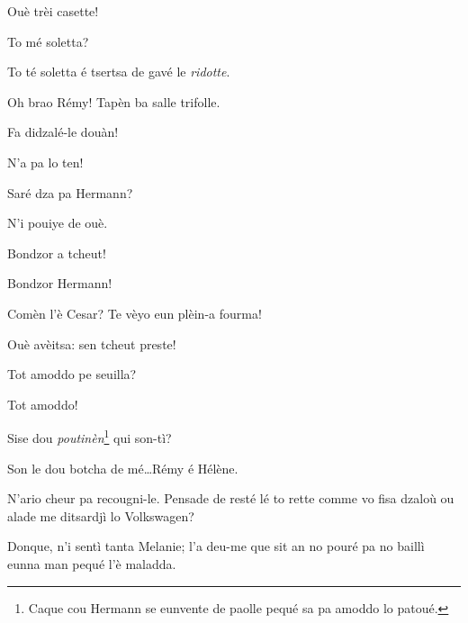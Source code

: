 \begin{drama}
\Cesarspeaks Ouè trèi casette!

\Helenespeaks To mé soletta?

\Cesarspeaks To té soletta é tsertsa de gavé le \textit{ridotte}.


\Cesarspeaks Oh brao Rémy! Tapèn ba salle trifolle.

\Remyspeaks Fa didzalé-le douàn!

\Cesarspeaks N'a pa lo ten!





\Cesarspeaks Saré dza pa Hermann?

\Cesarspeaks N'i pouiye de ouè. 




\Hermannspeaks Bondzor a tcheut!

\Cesarspeaks Bondzor Hermann!

\Hermannspeaks Comèn l'è Cesar? Te vèyo eun plèin-a fourma!

\Cesarspeaks Ouè avèitsa: sen tcheut preste!

\Hermannspeaks Tot amoddo pe seuilla?

\Cesarspeaks Tot amoddo!

\Hermannspeaks {} Sise dou \textit{poutinèn}\footnote{ Caque cou Hermann se eunvente de paolle pequé sa pa amoddo lo patoué.} qui son-tì?

\Cesarspeaks Son le dou botcha de mé\ldots Rémy é Hélène.

\Hermannspeaks N'ario cheur pa recougni-le.  Pensade de resté lé to rette comme vo fisa dzaloù ou alade me ditsardjì lo Volkswagen? 


\Hermannspeaks{} Donque, n'i sentì tanta Melanie; l'a deu-me que sit an no pouré pa no baillì eunna man pequé l'è maladda.


\end{drama}
